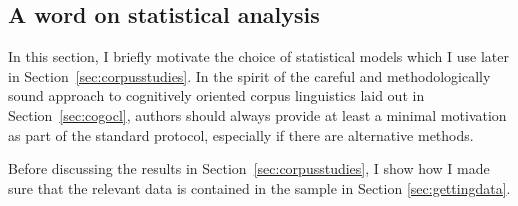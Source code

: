\documentclass[USenglish]{article}
\begin{document}

\subsection{A word on statistical analysis}
\label{sec:rightstatistics}

In this section, I briefly motivate the choice of statistical models which I use later in Section~\ref{sec:corpusstudies}.
In the spirit of the careful and methodologically sound approach to cognitively oriented corpus linguistics laid out in Section~\ref{sec:cogocl}, authors should always provide at least a minimal motivation as part of the standard protocol, especially if there are alternative methods.





Before discussing the results in Section~\ref{sec:corpusstudies}, I show how I made sure that the relevant data is contained in the sample in Section \ref{sec:gettingdata}.
\end{document}
